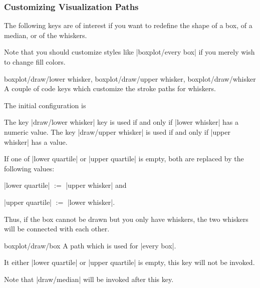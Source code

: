 \subsubsection{Customizing Visualization Paths}
The following keys are of interest if you want to redefine the shape of a box, of a median, or of the whiskers.

Note that you should customize styles like |boxplot/every box| if you merely wish to change fill colors.

\begin{pgfplotsxycodekeylist}{%
	boxplot/draw/lower whisker,%
	boxplot/draw/upper whisker,%
	boxplot/draw/whisker%
}
	A couple of code keys which customize the stroke paths for whiskers.

	The initial configuration is
\begin{codeexample}
\end{codeexample}

	The key |draw/lower whisker| key is used if and only if |lower whisker| has a numeric value. The key |draw/upper whisker| is used if and only if |upper whisker| has a value. 

	If one of |lower quartile| or |upper quartile| is empty, both are replaced by the following values:
	
	|lower quartile| $:=$ |upper whisker| and

	|upper quartile| $:=$ |lower whisker|.

	Thus, if the box cannot be drawn but you only have whiskers, the two whiskers will be connected with each other.
\end{pgfplotsxycodekeylist}

\begin{pgfplotscodekey}{boxplot/draw/box}
	A path which is used for |every box|.
\begin{codeexample}
\end{codeexample}

	It either |lower quartile| or |upper quartile| is empty, this key will not be invoked.

	Note that |draw/median| will be invoked after this key.
\end{pgfplotscodekey}

